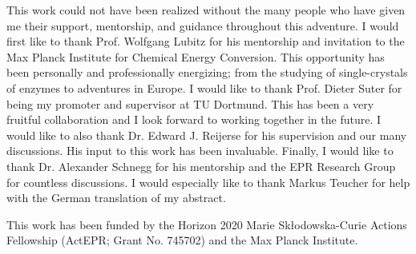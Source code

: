 
This work could not have been realized without the many people who have given me their support, mentorship, and guidance throughout this adventure. I would first like to thank Prof. Wolfgang Lubitz for his mentorship and invitation to the Max Planck Institute for Chemical Energy Conversion. This opportunity has been personally and professionally energizing; from the studying of single-crystals of enzymes to adventures in Europe. I would like to thank Prof. Dieter Suter for being my promoter and supervisor at TU Dortmund. This has been a very fruitful collaboration and I look forward to working together in the future. I would like to also thank Dr. Edward J. Reijerse for his supervision and our many discussions. His input to this work has been invaluable. Finally, I would like to thank Dr. Alexander Schnegg for his mentorship and the EPR Research Group for countless discussions. I would especially like to thank Markus Teucher for help with the German translation of my abstract. 

This work has been funded by the Horizon 2020 Marie Sk\l{}odowska-Curie Actions Fellowship (ActEPR; Grant No. 745702) and the Max Planck Institute. 

